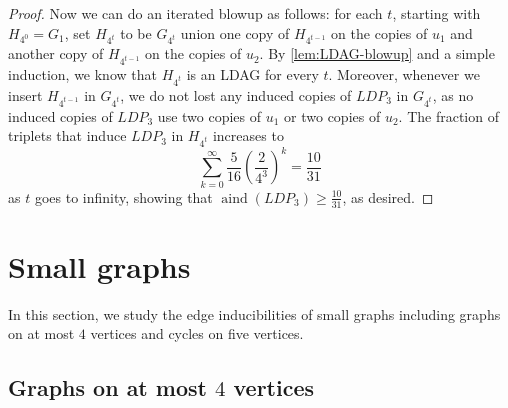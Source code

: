 \documentclass[reqno,11pt]{amsart}
\numberwithin{equation}{section}
\theoremstyle{definition}
\theoremstyle{remark}
\DeclareMathOperator{\aind}{aind}
\begin{document}
\begin{proof}
    Now we can do an iterated blowup as follows: for each $t$, starting with $H_{4^0}=G_1$, set $H_{4^t}$ to be $G_{4^t}$ union one copy of $H_{4^{t-1}}$ on the copies of $u_1$ and another copy of $H_{4^{t-1}}$ on the copies of $u_2$.
    By \cref{lem:LDAG-blowup} and a simple induction, we know that $H_{4^t}$ is an LDAG for every $t$.
    Moreover, whenever we insert $H_{4^{t-1}}$ in $G_{4^t}$, we do not lost any induced copies of $LDP_3$ in $G_{4^t}$, as no induced copies of $LDP_3$ use two copies of $u_1$ or two copies of $u_2$.
    The fraction of triplets that induce $LDP_3$ in $H_{4^t}$ increases to
    \[\sum_{k=0}^{\infty}\frac{5}{16}\left(\frac{2}{4^3}\right)^k = \frac{10}{31}\]
    as $t$ goes to infinity, showing that $\aind(LDP_3)\geq \frac{10}{31}$, as desired.
\end{proof}


\section{Small graphs}\label{section: small graphs}
In this section, we study the edge inducibilities of small graphs including graphs on at most $4$ vertices and cycles on five vertices.
\subsection{Graphs on at most $4$ vertices} \label{section: graphs smaller than 4}
\end{document}
